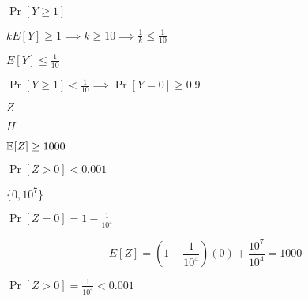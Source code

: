 \documentclass[10pt]{book}
\begin{document}
\begin{mdSnippets}
\begin{mdInlineSnippet}[df53696ef959582fd8f0074c5f3d8002]
$\Pr[Y \geq 1]$\end{mdInlineSnippet}%
\begin{mdInlineSnippet}[76134e538fdea81e24ea6288c0220223]%
$kE[Y] \geq 1 \implies k \geq 10 \implies \frac{1}{k} \leq \frac{1}{10}$\end{mdInlineSnippet}%
\begin{mdInlineSnippet}[bf982a40700282f0ad61725c0e9b0e4c]%
$E[Y] \leq \frac{1}{10}$\end{mdInlineSnippet}%
\begin{mdInlineSnippet}[1346a63f46295a1119af734f2ed97504]%
$\Pr[Y \geq 1] < \frac{1}{10} \implies \Pr[Y = 0] \geq 0.9$\end{mdInlineSnippet}%
\begin{mdInlineSnippet}[21c2e59531c8710156d34a3c30ac81d5]%
$Z$\end{mdInlineSnippet}%
\begin{mdInlineSnippet}[c1d9f50f86825a1a2302ec2449c17196]%
$H$\end{mdInlineSnippet}%
\begin{mdInlineSnippet}[31643e4ddc12791cc5b4de8fb20eb490]%
$\mathbb{E}[Z] \geq 1000$\end{mdInlineSnippet}%
\begin{mdInlineSnippet}[687e58917db02f504de7491e281a0961]%
$\Pr[ Z > 0] < 0.001$\end{mdInlineSnippet}%
\begin{mdInlineSnippet}[49b3e9035372b9ac1129c8258e835b08]%
$\{0, 10^7\}$\end{mdInlineSnippet}%
\begin{mdInlineSnippet}[db71044a13256d7913fdbe345f45c9a1]%
$\Pr[Z = 0] = 1 - \frac{1}{10^4}$\end{mdInlineSnippet}%
\begin{mdDisplaySnippet}[e97eef0aa539b3d20d902ed751f29f61]%
\[%
E[Z] = (1 - \frac{1}{10^4})(0) + \frac{10^7}{10^4} = 1000
\]%
\end{mdDisplaySnippet}%
\begin{mdInlineSnippet}%
$\Pr[Z > 0] = \frac{1}{10^4} < 0.001$\end{mdInlineSnippet}%
\begin{mdInlineSnippet}%

\end{mdInlineSnippet}
\end{mdSnippets}
\end{document}
